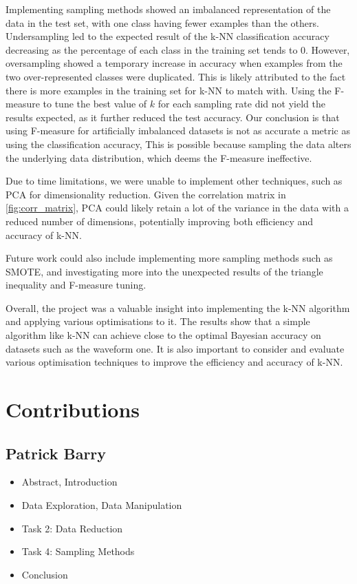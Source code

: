 \documentclass{article}
\theoremstyle{plain}
\theoremstyle{definition}
\theoremstyle{remark}
\begin{document}
    Implementing sampling methods showed an imbalanced representation of the data in the test set, with one class having fewer examples than the others. Undersampling led to the expected result of the k-NN classification accuracy decreasing as the percentage of each class in the training set tends to 0. However, oversampling showed a temporary increase in accuracy when examples from the two over-represented classes were duplicated. This is likely attributed to the fact there is more examples in the training set for k-NN to match with. Using the F-measure to tune the best value of $k$ for each sampling rate did not yield the results expected, as it further reduced the test accuracy. Our conclusion is that using F-measure for artificially imbalanced datasets is not as accurate a metric as using the classification accuracy, This is possible because sampling the data alters the underlying data distribution, which deems the F-measure ineffective.

    Due to time limitations, we were unable to implement other techniques, such as PCA for dimensionality reduction. Given the correlation matrix in \ref{fig:corr_matrix}, PCA could likely retain a lot of the variance in the data with a reduced number of dimensions, potentially improving both efficiency and accuracy of k-NN.

    Future work could also include implementing more sampling methods such as SMOTE, and investigating more into the unexpected results of the triangle inequality and F-measure tuning.

    Overall, the project was a valuable insight into implementing the k-NN algorithm and applying various optimisations to it. The results show that a simple algorithm like k-NN can achieve close to the optimal Bayesian accuracy on datasets such as the waveform one. It is also important to consider and evaluate various optimisation techniques to improve the efficiency and accuracy of k-NN.




\section{Contributions}
\subsection{Patrick Barry}
\begin{itemize}
    \item Abstract, Introduction
    \item Data Exploration, Data Manipulation
    \item Task 2: Data Reduction
    \item Task 4: Sampling Methods
    \item Conclusion
\end{itemize}
\end{document}

